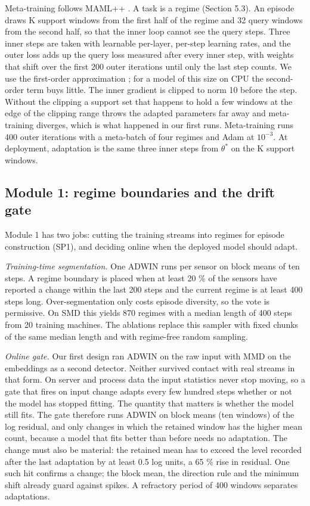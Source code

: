 Meta-training follows MAML++ \citep{antoniou2019mamlpp}. A task is a regime (Section 5.3). An episode draws K support windows from the first half of the regime and 32 query windows from the second half, so that the inner loop cannot see the query steps. Three inner steps are taken with learnable per-layer, per-step learning rates, and the outer loss adds up the query loss measured after every inner step, with weights that shift over the first 200 outer iterations until only the last step counts. We use the first-order approximation \citep{nichol2018fomaml}; for a model of this size on CPU the second-order term buys little. The inner gradient is clipped to norm 10 before the step. Without the clipping a support set that happens to hold a few windows at the edge of the clipping range throws the adapted parameters far away and meta-training diverges, which is what happened in our first runs. Meta-training runs 400 outer iterations with a meta-batch of four regimes and Adam at \(10^{-3}\). At deployment, adaptation is the same three inner steps from \(\theta^*\) on the K support windows.

\hypertarget{module-1-regime-boundaries-and-the-drift-gate}{%
\subsection{Module 1: regime boundaries and the drift gate}\label{module-1-regime-boundaries-and-the-drift-gate}}

Module 1 has two jobs: cutting the training streams into regimes for episode construction (SP1), and deciding online when the deployed model should adapt.

\emph{Training-time segmentation.} One ADWIN \citep{bifet2007adwin} runs per sensor on block means of ten steps. A regime boundary is placed when at least 20 \% of the sensors have reported a change within the last 200 steps and the current regime is at least 400 steps long. Over-segmentation only costs episode diversity, so the vote is permissive. On SMD this yields 870 regimes with a median length of 400 steps from 20 training machines. The ablations replace this sampler with fixed chunks of the same median length and with regime-free random sampling.

\emph{Online gate.} Our first design ran ADWIN on the raw input with MMD on the embeddings as a second detector. Neither survived contact with real streams in that form. On server and process data the input statistics never stop moving, so a gate that fires on input change adapts every few hundred steps whether or not the model has stopped fitting. The quantity that matters is whether the model still fits. The gate therefore runs ADWIN on block means (ten windows) of the log residual, and only changes in which the retained window has the higher mean count, because a model that fits better than before needs no adaptation. The change must also be material: the retained mean has to exceed the level recorded after the last adaptation by at least 0.5 log units, a 65 \% rise in residual. One such hit confirms a change; the block mean, the direction rule and the minimum shift already guard against spikes. A refractory period of 400 windows separates adaptations.

